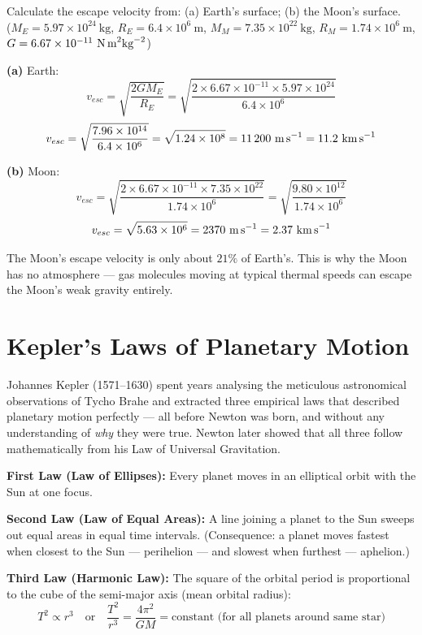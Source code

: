 \begin{examplebox}[8.3]
Calculate the escape velocity from:
(a) Earth's surface;
(b) the Moon's surface.\\
($M_E = 5.97\times10^{24}\ \text{kg}$,
$R_E = 6.4\times10^6\ \text{m}$,
$M_M = 7.35\times10^{22}\ \text{kg}$,
$R_M = 1.74\times10^6\ \text{m}$,
$G = 6.67\times10^{-11}\ \text{N\,m}^2\text{kg}^{-2}$)
\end{examplebox}
 
\begin{solutionbox}
\textbf{(a)} Earth:
\[
  v_{esc} = \sqrt{\frac{2GM_E}{R_E}}
  = \sqrt{\frac{2 \times 6.67\times10^{-11}
    \times 5.97\times10^{24}}{6.4\times10^6}}
\]
\[
   v_{esc} = \sqrt{\frac{7.96\times10^{14}}{6.4\times10^6}}
  = \sqrt{1.24\times10^8}
  = 11\,200\ \text{m\,s}^{-1} = 11.2\ \text{km\,s}^{-1}
\]
 
\textbf{(b)} Moon:
\[
  v_{esc} = \sqrt{\frac{2 \times 6.67\times10^{-11}
    \times 7.35\times10^{22}}{1.74\times10^6}}
  = \sqrt{\frac{9.80\times10^{12}}{1.74\times10^6}}
\]
\[
  v_{esc} = \sqrt{5.63\times10^6}
  = 2370\ \text{m\,s}^{-1} = 2.37\ \text{km\,s}^{-1}
\]
 
The Moon's escape velocity is only about $21\%$ of
Earth's. This is why the Moon has no atmosphere ---
gas molecules moving at typical thermal speeds can
escape the Moon's weak gravity entirely.
\end{solutionbox}
 
\section{Kepler's Laws of Planetary Motion}
 
Johannes Kepler (1571--1630) spent years analysing
the meticulous astronomical observations of Tycho
Brahe and extracted three empirical laws that
described planetary motion perfectly --- all before
Newton was born, and without any understanding of
\textit{why} they were true. Newton later showed
that all three follow mathematically from his Law
of Universal Gravitation.
 
\begin{lawbox}
\textbf{First Law (Law of Ellipses):}
Every planet moves in an elliptical orbit with the
Sun at one focus.
 
\vspace{0.5cm}
 
\textbf{Second Law (Law of Equal Areas):}
A line joining a planet to the Sun sweeps out equal
areas in equal time intervals. (Consequence: a planet
moves fastest when closest to the Sun --- perihelion
--- and slowest when furthest --- aphelion.)
 
\vspace{0.5cm}
 
\textbf{Third Law (Harmonic Law):}
The square of the orbital period is proportional to
the cube of the semi-major axis (mean orbital radius):
\[
  T^2 \propto r^3
  \quad \text{or} \quad
  \frac{T^2}{r^3} = \frac{4\pi^2}{GM}
  = \text{constant (for all planets around same star)}
\]
\end{lawbox}
 
